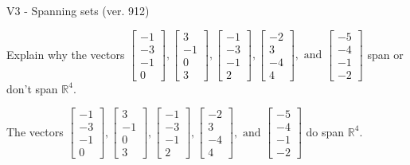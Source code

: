 \begin{exercise}
  \begin{exerciseTitle}V3 - Spanning sets (ver. 912)\end{exerciseTitle}
  \begin{exerciseStatement}
    Explain why the vectors \(\left[\begin{array}{r}
-1 \\
-3 \\
-1 \\
0
\end{array}\right] , \left[\begin{array}{r}
3 \\
-1 \\
0 \\
3
\end{array}\right] , \left[\begin{array}{r}
-1 \\
-3 \\
-1 \\
2
\end{array}\right] , \left[\begin{array}{r}
-2 \\
3 \\
-4 \\
4
\end{array}\right] , \text{ and } \left[\begin{array}{r}
-5 \\
-4 \\
-1 \\
-2
\end{array}\right]\) span or don't span \(\mathbb{R}^4\). 
	


  \end{exerciseStatement}
  \begin{exerciseAnswer}
   The vectors \(\left[\begin{array}{r}
-1 \\
-3 \\
-1 \\
0
\end{array}\right] , \left[\begin{array}{r}
3 \\
-1 \\
0 \\
3
\end{array}\right] , \left[\begin{array}{r}
-1 \\
-3 \\
-1 \\
2
\end{array}\right] , \left[\begin{array}{r}
-2 \\
3 \\
-4 \\
4
\end{array}\right] , \text{ and } \left[\begin{array}{r}
-5 \\
-4 \\
-1 \\
-2
\end{array}\right]\) 
  	 do  
	span \(\mathbb{R}^4\).
  



\end{exerciseAnswer}
\end{exercise}
